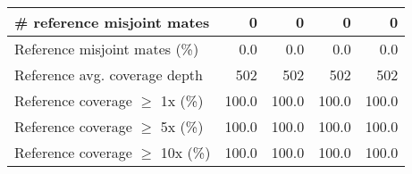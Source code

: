 \documentclass[12pt,a4paper]{article}
\begin{document}
\begin{table}[ht]
\begin{center}
\begin{tabular}{|l*{4}{|r}|}
\# reference misjoint mates & 0 & 0 & 0 & 0 \\ \hline
Reference misjoint mates (\%) & 0.0 & 0.0 & 0.0 & 0.0 \\ \hline
Reference avg. coverage depth & 502 & 502 & 502 & 502 \\ \hline
Reference coverage $\geq$ 1x (\%) & 100.0 & 100.0 & 100.0 & 100.0 \\ \hline
Reference coverage $\geq$ 5x (\%) & 100.0 & 100.0 & 100.0 & 100.0 \\ \hline
Reference coverage $\geq$ 10x (\%) & 100.0 & 100.0 & 100.0 & 100.0 \\ \hline
\end{tabular}
\end{center}
\end{table}
\end{document}
